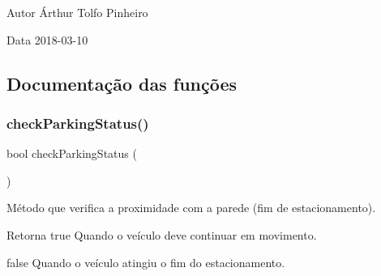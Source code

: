 \begin{DoxyAuthor}{Autor}
Árthur Tolfo Pinheiro 
\end{DoxyAuthor}
\begin{DoxyDate}{Data}
2018-\/03-\/10 
\end{DoxyDate}


\subsection{Documentação das funções}
\mbox{\label{parking-solution_8ino_a28085526e415309b308fea6fc73d744f}} 
\subsubsection{\texorpdfstring{check\+Parking\+Status()}{checkParkingStatus()}}
{\footnotesize\ttfamily bool check\+Parking\+Status (\begin{DoxyParamCaption}{ }\end{DoxyParamCaption})}



Método que verifica a proximidade com a parede (fim de estacionamento). 

\begin{DoxyReturn}{Retorna}
true Quando o veículo deve continuar em movimento. 

false Quando o veículo atingiu o fim do estacionamento. 
\end{DoxyReturn}

